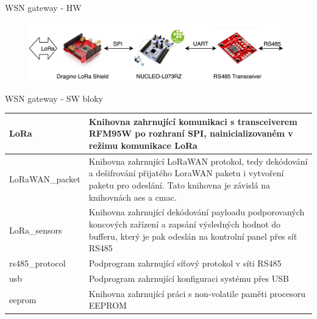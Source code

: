 \documentclass{beamer}
\begin{document}
  \begin{frame} {WSN gateway - HW}
	  
	\begin{figure}[!h]
		\centering
		\includegraphics[width=1\textwidth]{LoRaWAN_gw_RS485_blockDiagram_3}
		\label{fig:gatewayBlockDiagram}
	\end{figure}

  \end{frame}

  \begin{frame} {WSN gateway - SW bloky}

	{\fontsize{10}{6}\selectfont 

	\begin{longtable}{ |l|p{7cm}| }
		\hline
		LoRa            &  Knihovna zahrnující komunikaci s transceiverem RFM95W po rozhraní SPI, nainicializovaném v režimu komunikace LoRa    \\ \hline
		LoRaWAN\_packet  & Knihovna zahrnující LoRaWAN protokol, tedy dekódování a dešifrování přijatého LoraWAN paketu i vytvoření paketu pro odeslání. Tato knihovna je závislá na knihovnách aes a cmac.  \\ \hline
		LoRa\_sensors    & Knihovna zahrnující dekódování payloadu podporovaných koncových zařízení a zapsání výsledných hodnot do bufferu, který je pak odeslán na kontrolní panel přes síť RS485       \\ \hline
		rs485\_protocol  & Podprogram zahrnující síťový protokol v síti RS485         \\ \hline
		usb             &  Podprogram zahrnující konfiguraci systému přes USB        \\ \hline
		eeprom          &  Knihovna zahrnující práci s non-volatile paměti procesoru EEPROM     \\ \hline

	\end{longtable}
	}

\end{frame}
\end{document}
